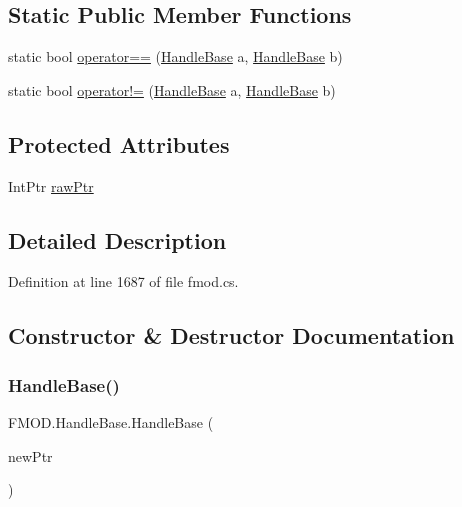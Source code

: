 \subsection*{Static Public Member Functions}
\begin{DoxyCompactItemize}
\item 
static bool \hyperlink{class_f_m_o_d_1_1_handle_base_adea8f4f13062b1179b1c9cd5410cf74c}{operator==} (\hyperlink{class_f_m_o_d_1_1_handle_base}{Handle\+Base} a, \hyperlink{class_f_m_o_d_1_1_handle_base}{Handle\+Base} b)
\item 
static bool \hyperlink{class_f_m_o_d_1_1_handle_base_a3d92afaeb0610742a2fb8c861e83b558}{operator!=} (\hyperlink{class_f_m_o_d_1_1_handle_base}{Handle\+Base} a, \hyperlink{class_f_m_o_d_1_1_handle_base}{Handle\+Base} b)
\end{DoxyCompactItemize}
\subsection*{Protected Attributes}
\begin{DoxyCompactItemize}
\item 
Int\+Ptr \hyperlink{class_f_m_o_d_1_1_handle_base_a9ce67499ada6887a5ec67be555d18eed}{raw\+Ptr}
\end{DoxyCompactItemize}


\subsection{Detailed Description}


Definition at line 1687 of file fmod.\+cs.



\subsection{Constructor \& Destructor Documentation}
\mbox{\label{class_f_m_o_d_1_1_handle_base_ae608e2ed16f62e4d75f04ccb53169b54}} 
\subsubsection{\texorpdfstring{Handle\+Base()}{HandleBase()}}
{\footnotesize\ttfamily F\+M\+O\+D.\+Handle\+Base.\+Handle\+Base (\begin{DoxyParamCaption}\item[{Int\+Ptr}]{new\+Ptr }\end{DoxyParamCaption})}



